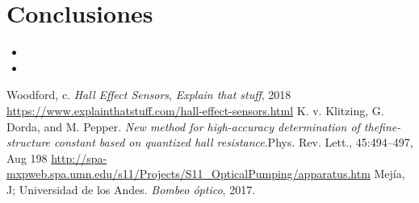 \documentclass[%
 reprint,
 amsmath,amssymb,
 aps,
]{revtex4-1}
\begin{document}
\section{Conclusiones}
\begin{itemize}
    \item 
    \item 
\end{itemize}

\begin{thebibliography}{9}

Woodford, c. \textit{Hall Effect Sensors}, \textit{Explain that stuff}, 2018 \url{https://www.explainthatstuff.com/hall-effect-sensors.html}
 K. v. Klitzing, G. Dorda, and M. Pepper. \textit{New method for high-accuracy determination of thefine-structure constant based on quantized hall resistance}.Phys. Rev. Lett., 45:494–497, Aug 198
\url{http://spa-mxpweb.spa.umn.edu/s11/Projects/S11_OpticalPumping/apparatus.htm}
Mejía, J; Universidad de los Andes. \textit{Bombeo óptico}, 2017.

\end{thebibliography}
\end{document}
